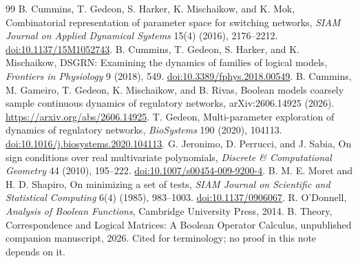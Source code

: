 \documentclass[11pt]{article}
\theoremstyle{definition}
\theoremstyle{remark}
\begin{document}
\begin{thebibliography}{99}
 B. Cummins, T. Gedeon, S. Harker, K. Mischaikow, and K. Mok, Combinatorial representation of parameter space for switching networks, \emph{SIAM Journal on Applied Dynamical Systems} 15(4) (2016), 2176--2212. \href{https://doi.org/10.1137/15M1052743}{doi:10.1137/15M1052743}.
 B. Cummins, T. Gedeon, S. Harker, and K. Mischaikow, DSGRN: Examining the dynamics of families of logical models, \emph{Frontiers in Physiology} 9 (2018), 549. \href{https://doi.org/10.3389/fphys.2018.00549}{doi:10.3389/fphys.2018.00549}.
 B. Cummins, M. Gameiro, T. Gedeon, K. Mischaikow, and B. Rivas, Boolean models coarsely sample continuous dynamics of regulatory networks, arXiv:2606.14925 (2026). \url{https://arxiv.org/abs/2606.14925}.
 T. Gedeon, Multi-parameter exploration of dynamics of regulatory networks, \emph{BioSystems} 190 (2020), 104113. \href{https://doi.org/10.1016/j.biosystems.2020.104113}{doi:10.1016/j.biosystems.2020.104113}.
 G. Jeronimo, D. Perrucci, and J. Sabia, On sign conditions over real multivariate polynomials, \emph{Discrete \& Computational Geometry} 44 (2010), 195--222. \href{https://doi.org/10.1007/s00454-009-9200-4}{doi:10.1007/s00454-009-9200-4}.
 B. M. E. Moret and H. D. Shapiro, On minimizing a set of tests, \emph{SIAM Journal on Scientific and Statistical Computing} 6(4) (1985), 983--1003. \href{https://doi.org/10.1137/0906067}{doi:10.1137/0906067}.
 R. O'Donnell, \emph{Analysis of Boolean Functions}, Cambridge University Press, 2014.
 B. Theory, Correspondence and Logical Matrices: A Boolean Operator Calculus, unpublished companion manuscript, 2026. Cited for terminology; no proof in this note depends on it.
\end{thebibliography}
\end{document}
